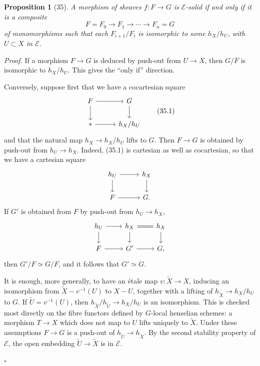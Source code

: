 \documentclass[11pt]{article}
\newcommand{\pt}{*}
\theoremstyle{deligne}
\newtheorem*{proposition*}{Proposition}
\newenvironment{proofdel}{\noindent\textit{Proof.}}{\hfill$\square$}
\begin{document}
\begin{proposition*}[35]
A morphism of sheaves \(f:F\to G\) is \(\mathcal E\)-solid if and only if it is a composite
\[
F=F_0\longrightarrow F_1\longrightarrow \cdots\longrightarrow F_n=G
\]
of monomorphisms such that each \(F_{i+1}/F_i\) is isomorphic to some \(h_X/h_U\), with \(U\subset X\) in \(\mathcal E\).
\end{proposition*}

\begin{proofdel}
If a morphism \(F\to G\) is deduced by push-out from \(U\to X\), then \(G/F\) is isomorphic to \(h_X/h_U\). This gives the ``only if'' direction.

Conversely, suppose first that we have a cocartesian square
\[
\begin{tikzcd}[column sep=2.8em,row sep=1.8em]
F \arrow[r] \arrow[d] & G \arrow[d]\\
\pt \arrow[r] & h_X/h_U
\end{tikzcd}
\tag{35.1}
\]
and that the natural map \(h_X\to h_X/h_U\) lifts to \(G\). Then \(F\to G\) is obtained by push-out from \(h_U\to h_X\). Indeed, (35.1) is cartesian as well as cocartesian, so that we have a cartesian square
\[
\begin{tikzcd}[column sep=2.8em,row sep=1.8em]
h_U \arrow[r] \arrow[d] & h_X \arrow[d]\\
F \arrow[r] & G .
\end{tikzcd}
\]
If \(G'\) is obtained from \(F\) by push-out from \(h_U\to h_X\),
\[
\begin{tikzcd}[column sep=2.3em,row sep=1.6em]
h_U \arrow[r] \arrow[d] & h_X \arrow[d] \arrow[r,equal] & h_X \arrow[d]\\
F \arrow[r] & G' \arrow[r] & G ,
\end{tikzcd}
\]
then \(G'/F\simeq G/F\), and it follows that \(G'\simeq G\).

It is enough, more generally, to have an étale map \(v:\widetilde X\to X\), inducing an isomorphism from \(\widetilde X-v^{-1}(U)\) to \(X-U\), together with a lifting of \(h_{\widetilde X}\to h_X/h_U\) to \(G\). If \(\widetilde U=v^{-1}(U)\), then \(h_{\widetilde X}/h_{\widetilde U}\to h_X/h_U\) is an isomorphism. This is checked most directly on the fibre functors defined by \(G\)-local henselian schemes: a morphism \(T\to X\) which does not map to \(U\) lifts uniquely to \(\widetilde X\). Under these assumptions \(F\to G\) is a push-out of \(h_{\widetilde U}\to h_{\widetilde X}\). By the second stability property of \(\mathcal E\), the open embedding \(\widetilde U\to \widetilde X\) is in \(\mathcal E\).


\end{proofdel}
\end{document}
